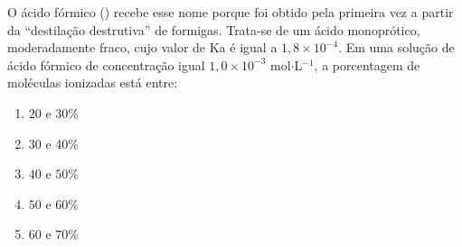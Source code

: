 O ácido fórmico () recebe esse nome porque foi obtido pela primeira vez a partir da “destilação destrutiva” de formigas.
Trata-se de um ácido monoprótico, moderadamente fraco, cujo valor de Ka é igual a $1,8 \times 10^{-4}$. Em uma solução de ácido fórmico de concentração igual $1,0 \times 10^{-3}$ mol$\cdot$L$^{-1}$, a porcentagem de moléculas ionizadas está entre:

\begin{enumerate}[label = (\scalealph{\alph*})]
	\item $20$ e $30 \%$
	\item $30$ e $40 \%$
	\item $40$ e $50 \%$
	\item $50$ e $60 \%$
	\item $60$ e $70 \%$
\end{enumerate}
